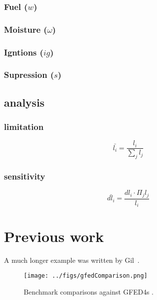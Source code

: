 \documentclass[12pt]{article}
\begin{document}
\subsubsection{Fuel ($w$)}

\subsubsection{Moisture ($\omega$)}

\subsubsection{Igntions ($ig$)}

\subsubsection{Supression ($s$)}

\subsection{analysis}

\subsubsection{limitation}

\begin{equation}
    \bar{l_{i}} = \frac{l_{i}}{\sum_{j} l_{j}}
\end{equation}

\subsubsection{sensitivity}

\begin{equation}
    \bar{dl_{i}} = \frac{dl_{i} \cdot \Pi_{j} l_{j}}{l_{i}}
\end{equation}


\section{Previous work}\label{previous work}
A much longer \LaTeXe{} example was written by Gil~\cite{Gil:02}.


\begin{figure}[!ht]
  \centering
    \texttt{[image: ../figs/gfedComparison.png]}
   
  \caption{Benchmark comparisons against GFED4s \citep{Giglio2013}.}
\end{figure}
\end{document}
